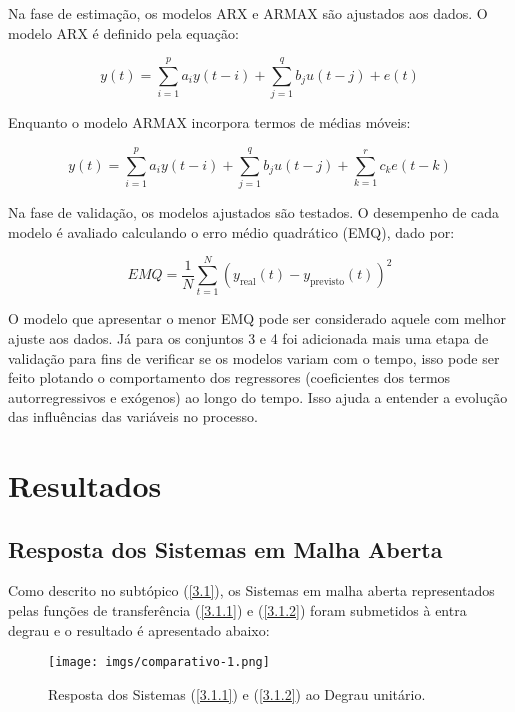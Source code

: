 \documentclass[a4paper,12pt]{article}
\begin{document}
Na fase de estimação, os modelos ARX e ARMAX são ajustados aos dados. O modelo ARX é definido pela equação:

\begin{equation*}\label{3.7.1}
    y(t) = \sum_{i=1}^{p} a_i y(t-i) + \sum_{j=1}^{q} b_j u(t-j) + e(t) \tag{3.7.1}
\end{equation*}

Enquanto o modelo ARMAX incorpora termos de médias móveis:

\begin{equation*}\label{3.7.2}
    y(t) = \sum_{i=1}^{p} a_i y(t-i) + \sum_{j=1}^{q} b_j u(t-j) + \sum_{k=1}^{r} c_k e(t-k) \tag{3.7.2}
\end{equation*}

Na fase de validação, os modelos ajustados são testados. O desempenho de cada modelo é avaliado calculando o erro médio quadrático (EMQ), dado por:

\begin{equation}
    EMQ = \frac{1}{N} \sum_{t=1}^{N} (y_{\text{real}}(t) - y_{\text{previsto}}(t))^2 \tag{3.7.3}
\end{equation}

O modelo que apresentar o menor EMQ pode ser considerado aquele com melhor ajuste aos dados. Já para os conjuntos 3 e 4 foi adicionada mais uma etapa de validação para fins de verificar se os modelos variam com o tempo, isso pode ser feito plotando o comportamento dos regressores (coeficientes dos termos autorregressivos e exógenos) ao longo do tempo. Isso ajuda a entender a evolução das influências das variáveis no processo.

\newpage
\section{Resultados}

\subsection{Resposta dos Sistemas em Malha Aberta}\label{4.1}

Como descrito no subtópico (\ref{3.1}), os Sistemas em malha aberta representados pelas funções de transferência (\ref{3.1.1}) e (\ref{3.1.2}) foram submetidos à entra degrau e o resultado é apresentado abaixo:

\begin{figure}[h!]\label{fig2}
  \centering
  \texttt{[image: imgs/comparativo-1.png]}
  \caption{Resposta dos Sistemas (\ref{3.1.1}) e (\ref{3.1.2}) ao Degrau unitário.}
\end{figure}
\end{document}
